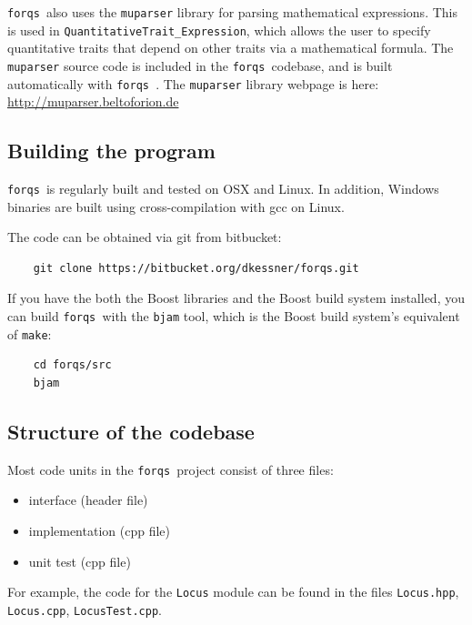 \documentclass{article}
\newcommand{\forqs}[0]{\texttt{forqs }}
\begin{document}
\forqs also uses the \texttt{muparser} library for parsing mathematical
expressions.  This is used in \texttt{QuantitativeTrait\_Expression}, which
allows the user to specify quantitative traits that depend on other traits via
a mathematical formula.  The \texttt{muparser} source code is included in the 
\forqs codebase, and is built automatically with \forqs.  The 
\texttt{muparser} library webpage is here: \\
\url{http://muparser.beltoforion.de}


\subsection{Building the program}

\forqs is regularly built and tested on OSX and Linux.  In addition,
Windows binaries are built using cross-compilation with gcc on Linux.

The code can be obtained via git from bitbucket:
\begin{small}
\begin{verbatim}
    git clone https://bitbucket.org/dkessner/forqs.git
\end{verbatim}
\end{small}

If you have the both the Boost libraries and the Boost build system installed,
you can build \forqs with the \texttt{bjam} tool, which is the Boost build system's 
equivalent of \texttt{make}:
\begin{small}
\begin{verbatim}
    cd forqs/src
    bjam
\end{verbatim}
\end{small}


\subsection{Structure of the codebase}

Most code units in the \forqs project consist of three files:
\begin{itemize}
    \item interface (header file)
    \item implementation (cpp file)
    \item unit test (cpp file)
\end{itemize}

For example, the code for the \texttt{Locus} module can be found in the files
\texttt{Locus.hpp}, \texttt{Locus.cpp}, \texttt{LocusTest.cpp}.
\end{document}
